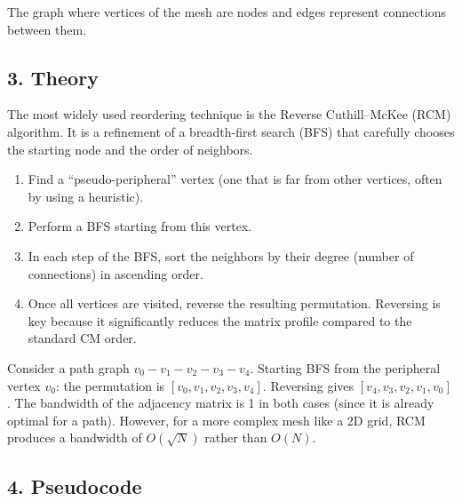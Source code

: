 \begin{definition}\label{def:adjacency_graph}
The graph where vertices of the mesh are nodes and edges represent connections between them.
\end{definition}

\subsection{3. Theory}

The most widely used reordering technique is the Reverse Cuthill--McKee (RCM) algorithm\cite{cuthill1969}. It is a refinement of a breadth-first search (BFS) that carefully chooses the starting node and the order of neighbors.

\begin{enumerate}
    \item Find a ``pseudo-peripheral'' vertex (one that is far from other vertices, often by using a heuristic).
    \item Perform a BFS starting from this vertex.
    \item In each step of the BFS, sort the neighbors by their degree (number of connections) in ascending order.
    \item Once all vertices are visited, reverse the resulting permutation. Reversing is key because it significantly reduces the matrix profile compared to the standard CM order.
\end{enumerate}

\begin{example}\label{ex:rcm_reordering}
Consider a path graph $v_0 - v_1 - v_2 - v_3 - v_4$. Starting BFS from the peripheral vertex $v_0$: the permutation is $[v_0, v_1, v_2, v_3, v_4]$. Reversing gives $[v_4, v_3, v_2, v_1, v_0]$. The bandwidth of the adjacency matrix is 1 in both cases (since it is already optimal for a path). However, for a more complex mesh like a 2D grid, RCM produces a bandwidth of $O(\sqrt{N})$ rather than $O(N)$.
\end{example}

\subsection{4. Pseudocode}

